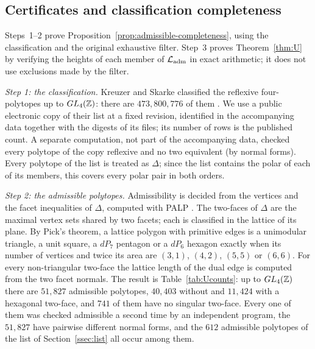 \subsection{Certificates and classification completeness}\label{ssec:uproof}
Steps~1--2 prove Proposition~\ref{prop:admissible-completeness}, using the classification and the original exhaustive
filter. Step~3 proves Theorem~\ref{thm:U} by verifying the heights of each member of $\mathcal L_{\rm adm}$ in exact
arithmetic; it does not use exclusions made by the filter.

\emph{Step 1: the classification.} Kreuzer and Skarke classified the reflexive four-polytopes up to $GL_4(\mathbb Z)$: there are
$473{,}800{,}776$ of them \cite{KS00}. We use a public electronic copy of their list at a fixed revision, identified in
the accompanying data together with the digests of its files; its number of rows is the published count. A separate
computation, not part of the accompanying data, checked every polytope of the copy reflexive and no two equivalent (by
normal forms). Every polytope of the list is treated as
$\Delta$; since the list contains the polar of each of its members, this covers every polar pair in both orders.

\emph{Step 2: the admissible polytopes.} Admissibility is decided from the vertices and the facet inequalities of
$\Delta$, computed with PALP \cite{PALP}. The two-faces of $\Delta$ are the maximal vertex sets shared by two facets; each is
classified in the lattice of its plane. By Pick's theorem, a lattice polygon with primitive edges is a unimodular
triangle, a unit square, a $dP_7$ pentagon or a $dP_6$ hexagon exactly when its number of vertices and twice its area are
$(3,1)$, $(4,2)$, $(5,5)$ or $(6,6)$. For every non-triangular two-face the lattice length of the dual edge is computed
from the two facet normals. The result is Table~\ref{tab:Ucounts}: up to $GL_4(\mathbb Z)$ there are $51{,}827$ admissible
polytopes, $40{,}403$ without and $11{,}424$ with a hexagonal two-face, and $741$ of them have no singular two-face. Every one of them was checked admissible a second time by an independent
program, the $51{,}827$ have pairwise different normal forms, and the $612$ admissible polytopes of the list of
Section~\ref{ssec:list} all occur among them.

